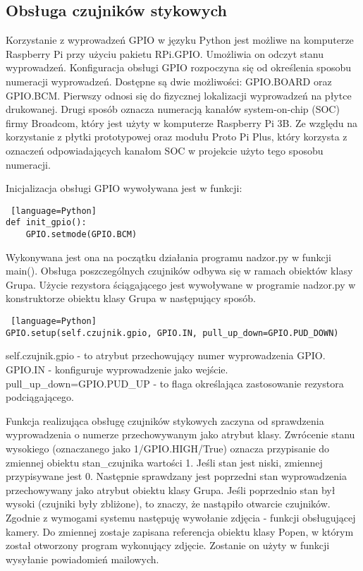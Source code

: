 \documentclass[a4paper,12pt,twoside]{article}
\begin{document}
\subsection{Obsługa czujników stykowych}
Korzystanie z wyprowadzeń GPIO w języku Python jest możliwe na komputerze Raspberry Pi przy użyciu pakietu RPi.GPIO. Umożliwia on odczyt stanu wyprowadzeń. Konfiguracja obsługi GPIO rozpoczyna się od określenia sposobu numeracji wyprowadzeń. Dostępne są dwie możliwości: GPIO.BOARD oraz GPIO.BCM. Pierwszy odnosi się do fizycznej lokalizacji wyprowadzeń na płytce drukowanej. Drugi sposób oznacza numeracją kanałów system-on-chip (SOC) firmy Broadcom, który jest użyty w komputerze Raspberry Pi 3B. Ze względu na korzystanie z płytki prototypowej oraz modułu Proto Pi Plus, który korzysta z oznaczeń odpowiadających kanałom SOC w projekcie użyto tego sposobu numeracji.

Inicjalizacja obsługi GPIO wywoływana jest w funkcji:  
\begin{lstlisting} [language=Python]
def init_gpio():
    GPIO.setmode(GPIO.BCM)
\end{lstlisting}
Wykonywana jest ona na początku działania programu nadzor.py w funkcji main(). Obsługa poszczególnych czujników odbywa się w ramach obiektów klasy Grupa. Użycie rezystora ściągającego jest wywoływane w programie nadzor.py w konstruktorze obiektu klasy Grupa w następujący sposób.
\begin{lstlisting} [language=Python]
GPIO.setup(self.czujnik.gpio, GPIO.IN, pull_up_down=GPIO.PUD_DOWN)
\end{lstlisting}
self.czujnik.gpio - to atrybut przechowujący numer wyprowadzenia GPIO.
GPIO.IN - konfiguruje wyprowadzenie jako wejście.
pull{\_}up{\_}down=GPIO.PUD{\_}UP - to flaga określająca zastosowanie rezystora podciągającego.

Funkcja realizująca obsługę czujników stykowych zaczyna od sprawdzenia wyprowadzenia o numerze przechowywanym jako atrybut klasy. Zwrócenie stanu wysokiego (oznaczanego jako 1/GPIO.HIGH/True) oznacza przypisanie do zmiennej obiektu stan{\_}czujnika wartości 1. Jeśli stan jest niski, zmiennej przypisywane jest 0. Następnie sprawdzany jest poprzedni stan wyprowadzenia przechowywany jako atrybut obiektu klasy Grupa. Jeśli poprzednio stan był wysoki (czujniki były zbliżone), to znaczy, że nastąpiło otwarcie czujników. Zgodnie z wymogami systemu następuję wywołanie zdjęcia - funkcji obsługującej kamery. Do zmiennej zostaje zapisana referencja obiektu klasy Popen, w którym został otworzony program wykonujący zdjęcie. Zostanie on użyty w funkcji wysyłanie powiadomień mailowych.
\end{document}
